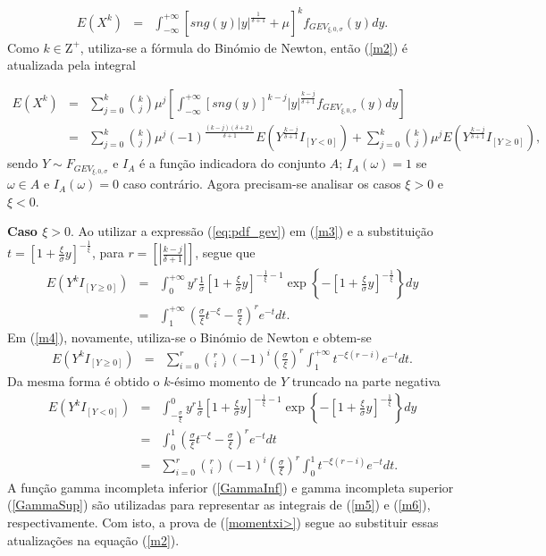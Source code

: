 \documentclass[pdftex,11pt]{article}%
\numberwithin{equation}{section} %
\begin{document}
	\begin{eqnarray}\label{m2}
		E(X^k)&=& \int_{-\infty}^{+\infty} [ sng(y)|y|^{\frac{1}{\delta+1}}+\mu]^k f_{GEV_{\xi, 0, \sigma}}(y)dy. 
	\end{eqnarray}
	Como $k\in \mathrm{Z^+}$, utiliza-se a fórmula do Binómio de Newton, então (\ref{m2}) é atualizada pela integral
	
	\begin{eqnarray}\label{m3}
		E(X^k)&=& \sum_{j=0}^{k} \binom{k}{j} \mu^{j} \left[ \int_{-\infty}^{+\infty} [ sng(y)]^{k-j}
		|y|^{\frac{k-j}{\delta+1}} f_{GEV_{\xi, 0, \sigma}}(y)dy\right]\nonumber\\
		&=&  \sum_{j=0}^{k} \binom{k}{j} \mu^{j} (-1)^{\frac{(k-j)(\delta+2)}{\delta+1}} E\left(Y^{\frac{k-j}{\delta+1}}I_{[Y<0]}\right)
		+  \sum_{j=0}^{k} \binom{k}{j} \mu^{j} E\left(Y^{\frac{k-j}{\delta+1}}I_{[Y\geq 0]}\right),
	\end{eqnarray}
	sendo $Y\sim F_{GEV_{\xi, 0, \sigma}}$ e $I_A$ é a função indicadora do conjunto $A$;  $I_{A}(\omega)=1$ se $\omega \in A$ e $I_{A}(\omega)=0$  caso contrário.
	Agora precisam-se analisar os casos $\xi>0$ e  $\xi<0$.
	
	\textbf{Caso $\xi>0$}. Ao utilizar a expressão (\ref{eq:pdf_gev}) em (\ref{m3}) e a substituição $t=\left[1+\frac{\xi}{\sigma}y\right]^{-\frac{1}{\xi}}$, para $r=[|\frac{k-j}{\delta+1}|] $, segue que
	\begin{eqnarray}\label{m4}
		E(Y^k I_{[Y\geq 0]})&=&\int_{0}^{+\infty}y^{r}\frac{1}{\sigma}\left[1+\frac{\xi}{\sigma}y \right]^{-\frac{1}{\xi}-1} \exp \left\{-\left[1+\frac{\xi}{\sigma}y\right]^{-\frac{1}{\xi}}\right\} dy\nonumber\\
		&=&\int_{1}^{+\infty} \left( \frac{\sigma}{\xi} t^{-\xi}- \frac{\sigma}{\xi}\right)^{r}e^{-t}  dt.
	\end{eqnarray}
	Em (\ref{m4}), novamente,  utiliza-se o Binómio de Newton  e obtem-se
	\begin{eqnarray}\label{m5}
		E(Y^k I_{[Y\geq 0]})
		&=& \sum_{i=0}^{r} \binom{r}{i}(-1)^{i} \left( \frac{\sigma}{\xi}\right)^{r} \int_{1}^{+\infty} t^{-\xi (r-i)}  e^{-t} dt.
	\end{eqnarray}
	Da mesma forma é obtido  o $k$-ésimo momento  de $Y$ truncado na parte negativa
	\begin{eqnarray}\label{m6}
		E(Y^k I_{[Y < 0]})&=&\int_{-\frac{\sigma}{\xi}}^{0}y^{r}\frac{1}{\sigma}\left[1+\frac{\xi}{\sigma}y \right]^{-\frac{1}{\xi}-1} \exp \left\{-\left[1+\frac{\xi}{\sigma}y\right]^{-\frac{1}{\xi}}\right\}dy \nonumber\\
		&=&\int_{0}^{1} \left( \frac{\sigma}{\xi} t^{-\xi}- \frac{\sigma}{\xi}\right)^{r}e^{-t}  dt \nonumber\\
		&=& \sum_{i=0}^{r} \binom{r}{i}(-1)^{i} \left( \frac{\sigma}{\xi}\right)^{r} \int_{0}^{1} t^{-\xi (r-i)}  e^{-t} dt.
	\end{eqnarray}
	A  função gamma incompleta inferior (\ref{GammaInf}) e gamma incompleta superior (\ref{GammaSup}) são utilizadas para representar as integrais de  (\ref{m5}) e (\ref{m6}), respectivamente. Com isto, a prova de (\ref{momentxi>}) segue ao substituir essas atualizações  na equação (\ref{m2}).
	
\end{document}
